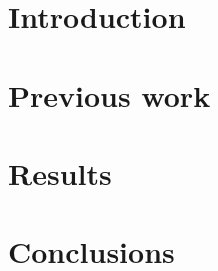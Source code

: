 \section{Introduction} %
\label{sec:introduction}


\section{Previous work} %
\label{sec:previous_work}


\section{Results} %
\label{sec:results}


\section{Conclusions} %
\label{sec:conclusions}

